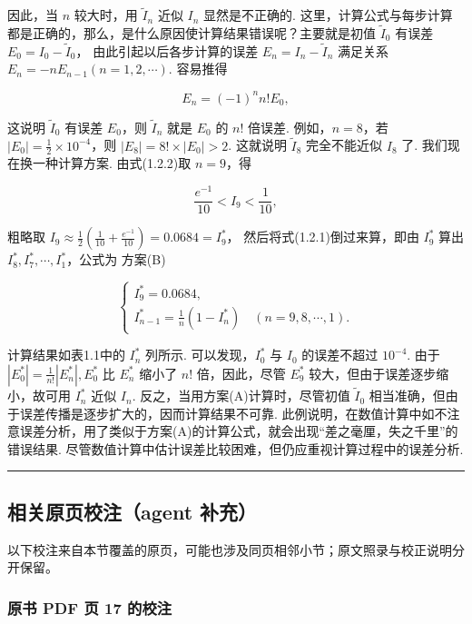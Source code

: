 \documentclass[
  10pt,
  fontset=fandol]{ctexart}
\begin{document}
因此，当 \(n\) 较大时，用 \(\tilde{I}_n\) 近似 \(I_n\) 显然是不正确的. 这里，计算公式与每步计算都是正确的，那么，是什么原因使计算结果错误呢？主要就是初值 \(\tilde{I}_0\) 有误差 \(E_0 = I_0 - \tilde{I}_0\)， 由此引起以后各步计算的误差 \(E_n = I_n - \tilde{I}_n\) 满足关系 \(E_n = -nE_{n-1}(n=1,2,\cdots)\). 容易推得

\[
E_n = (-1)^n n! E_0,
\]

这说明 \(\tilde{I}_0\) 有误差 \(E_0\)，则 \(\tilde{I}_n\) 就是 \(E_0\) 的 \(n!\) 倍误差. 例如，\(n=8\)，若 \(|E_0| = \frac{1}{2} \times 10^{-4}\)，则 \(|E_8| = 8! \times |E_0| > 2\). 这就说明 \(\tilde{I}_8\) 完全不能近似 \(I_8\) 了. 我们现在换一种计算方案. 由式(1.2.2)取 \(n=9\)，得

\[
\frac{e^{-1}}{10} < I_9 < \frac{1}{10},
\]

粗略取 \(I_9 \approx \frac{1}{2}\left(\frac{1}{10} + \frac{e^{-1}}{10}\right) = 0.0684 = I_9^*\)， 然后将式(1.2.1)倒过来算，即由 \(I_9^*\) 算出 \(I_8^*, I_7^*, \cdots, I_1^*\)，公式为 方案(B)

\[
\begin{cases} I_9^* = 0.0684, \\ I_{n-1}^* = \frac{1}{n}(1 - I_n^*) \quad (n = 9, 8, \cdots, 1). \end{cases}
\]

计算结果如表1.1中的 \(I_n^*\) 列所示. 可以发现，\(I_0^*\) 与 \(I_0\) 的误差不超过 \(10^{-4}\). 由于 \(|E_0^*| = \frac{1}{n!}|E_n^*|, E_0^*\) 比 \(E_n^*\) 缩小了 \(n!\) 倍，因此，尽管 \(E_9^*\) 较大，但由于误差逐步缩小，故可用 \(I_n^*\) 近似 \(I_n\). 反之，当用方案(A)计算时，尽管初值 \(\tilde{I}_0\) 相当准确，但由于误差传播是逐步扩大的，因而计算结果不可靠. 此例说明，在数值计算中如不注意误差分析，用了类似于方案(A)的计算公式，就会出现``差之毫厘，失之千里''的错误结果. 尽管数值计算中估计误差比较困难，但仍应重视计算过程中的误差分析.

\begin{center}\rule{0.5\linewidth}{0.5pt}\end{center}

\subsection{相关原页校注（agent 补充）}\label{ux76f8ux5173ux539fux9875ux6821ux6ce8agent-ux8865ux5145}

以下校注来自本节覆盖的原页，可能也涉及同页相邻小节；原文照录与校正说明分开保留。

\subsubsection{原书 PDF 页 17 的校注}\label{ux539fux4e66-pdf-ux9875-17-ux7684ux6821ux6ce8}
\end{document}
